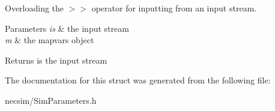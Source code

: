 Overloading the $>$$>$ operator for inputting from an input stream. 


\begin{DoxyParams}{Parameters}
{\em is} & the input stream \\
\hline
{\em m} & the mapvars object \\
\hline
\end{DoxyParams}
\begin{DoxyReturn}{Returns}
is the input stream 
\end{DoxyReturn}


The documentation for this struct was generated from the following file\+:\begin{DoxyCompactItemize}
\item 
necsim/Sim\+Parameters.\+h\end{DoxyCompactItemize}
